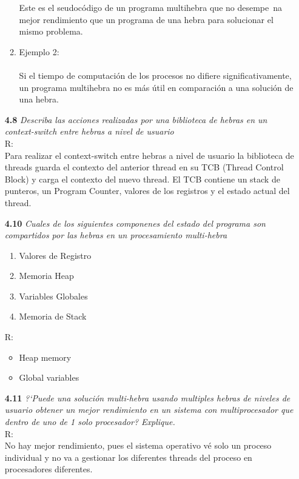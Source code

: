 \begin{itemize}
\begin{enumerate}
Este es el seudoc\'odigo de un programa multihebra que no desempe~na mejor rendimiento que un programa de una hebra para solucionar el mismo problema.\\
		\item Ejemplo 2:\\ \\
			Si el tiempo de computaci\'on de los procesos no difiere significativamente, un programa multihebra no es m\'as \'util en comparaci\'on a una soluci\'on de una hebra.\\
	\end{enumerate}
\item[\textbf{4.8}]\emph{ Describa las acciones realizadas por una biblioteca de hebras en un context-switch entre hebras a nivel de usuario }\\
R:\\
Para realizar el context-switch entre hebras a nivel de usuario la biblioteca de threads guarda el contexto del anterior thread en su TCB (Thread Control Block) y carga el contexto del nuevo thread. El TCB contiene un stack de punteros, un Program Counter, valores de los registros y el estado actual del thread.\\
\item[\textbf{4.10}]\emph{ Cuales de los siguientes componenes del estado del programa son compartidos por las hebras en un procesamiento multi-hebra}
	\begin{enumerate}
		\item Valores de Registro
		\item Memoria Heap
		\item Variables Globales
		\item Memoria de Stack
	\end{enumerate}
	R:
	 \begin{itemize}
		\item Heap memory
		\item Global variables
	 \end{itemize}
\item[\textbf{4.11}]\emph{ ?`Puede una soluci\'on multi-hebra usando multiples hebras de niveles de usuario obtener un mejor rendimiento en un sistema con multiprocesador que dentro de uno de 1 solo procesador? Explique.}\\
R:\\
No hay mejor rendimiento, pues el sistema operativo v\'e solo un proceso individual y no va a gestionar los diferentes threads del proceso en procesadores diferentes.\\

\end{itemize}
